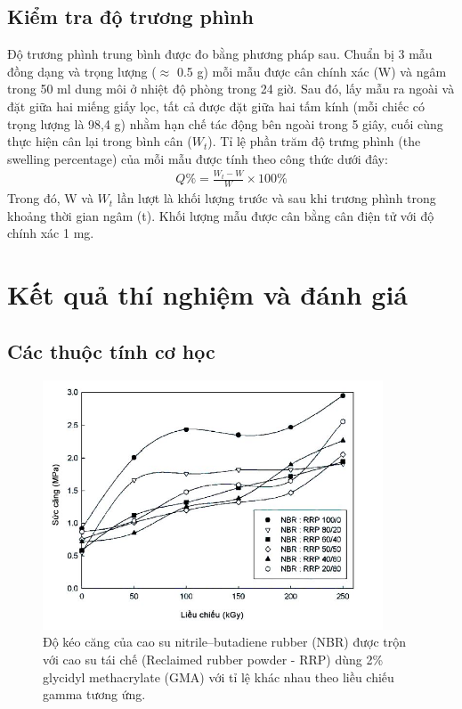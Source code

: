 \documentclass[12pt,a4paper]{article}
\begin{document}
		\subsection{Kiểm tra độ trương phình}
		Độ trương phình trung bình được đo bằng phương pháp sau. Chuẩn bị 3 mẫu đồng dạng và trọng lượng ($\approx$
0.5 g) mỗi mẫu được cân chính xác (W) và ngâm trong 50 ml dung môi ở nhiệt độ phòng trong 24 giờ. Sau đó, lấy
mẫu ra ngoài và đặt giữa hai miếng giấy lọc, tất cả được đặt giữa hai tấm kính (mỗi chiếc có trọng lượng là 98,4 g)
nhằm hạn chế tác động bên ngoài trong 5 giây, cuối cùng thực hiện cân lại trong bình cân ($W_t$). Tỉ lệ phần trăm độ
trưng phình (the swelling percentage) của mỗi mẫu được tính theo công thức dưới đây: 
	\begin{eqnarray}
		Q\% = \frac{W_t - W}{W}\times 100 \%
	\end{eqnarray}
	Trong đó, W và $W_t$ lần lượt là khối lượng trước và sau khi trương phình trong khoảng thời gian ngâm (t).
Khối lượng mẫu được cân bằng cân điện tử với độ chính xác 1 mg.
	
	\section{Kết quả thí nghiệm và đánh giá}
	
	\subsection{Các thuộc tính cơ học}
	
	\begin{figure}
		\centering
		\includegraphics[width=0.9\textwidth]{3.JPG}
		\caption{Độ kéo căng của cao su nitrile–butadiene rubber (NBR) được trộn với cao su tái chế (Reclaimed
rubber powder - RRP) dùng 2\% glycidyl methacrylate (GMA) với tỉ lệ khác nhau theo liều chiếu gamma tương ứng.}
		\label{fig:HINH1}		
	\end{figure}
	
\end{document}
